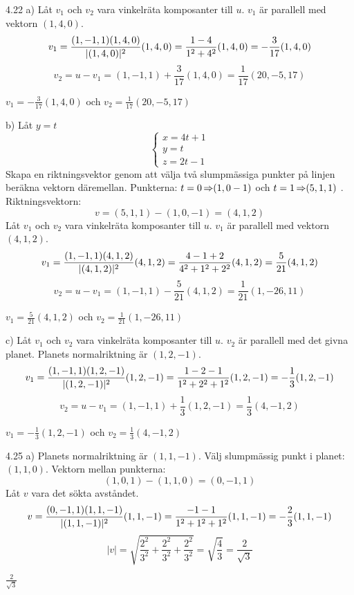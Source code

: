 \begin{task}{4.22 a)}
	Låt $v_1$ och $v_2$ vara vinkelräta komposanter till $u$. $v_1$ är parallell med vektorn $(1,4,0)$.
	\[v_1=\frac{(1,-1,1)\*(1,4,0)}{|(1,4,0)|^2}(1,4,0)=
	\frac{1-4}{1^2+4^2}(1,4,0)=
	-\frac{3}{17}(1,4,0)\]
	\[v_2=u-v_1=(1,-1,1)+\frac{3}{17}(1,4,0)=\frac{1}{17}(20,-5,17)\]

	\ans $v_1=-\frac{3}{17}(1,4,0)$ och $v_2=\frac{1}{17}(20,-5,17)$
\end{task}

\pagebreak
\begin{task}{b)}
	Låt $y=t$
	\[\begin{cases}
		x=4t+1 \\
		y=t \\
		z=2t-1
	\end{cases}\]
	Skapa en riktningsvektor genom att välja två slumpmässiga punkter på linjen beräkna vektorn däremellan.
	Punkterna: $t=0 \operatorname{\Rightarrow} (1,0-1)$ och $t=1 \operatorname{\Rightarrow} (5,1,1)$ . Riktningsvektorn:
	\[v = (5,1,1)-(1,0,-1)=(4,1,2)\]
	Låt $v_1$ och $v_2$ vara vinkelräta komposanter till $u$. $v_1$ är parallell med vektorn $(4,1,2)$.
	\[v_1=\frac{(1,-1,1)\*(4,1,2)}{|(4,1,2)|^2}(4,1,2)=
	\frac{4-1+2}{4^2+1^2+2^2}(4,1,2)=
	\frac{5}{21}(4,1,2)\]
	\[v_2=u-v_1=
	(1,-1,1)-\frac{5}{21}(4,1,2)=
	\frac{1}{21}(1,-26,11)\]

	\ans $v_1=\frac{5}{21}(4,1,2)$ och $v_2=\frac{1}{21}(1,-26,11)$
\end{task}

\begin{task}{c)}
	Låt $v_1$ och $v_2$ vara vinkelräta komposanter till $u$. $v_2$ är parallell med det givna planet.
	Planets normalriktning är $(1,2,-1)$.
	\[v_1=\frac{(1,-1,1)\*(1,2,-1)}{|(1,2,-1)|^2}(1,2,-1)=
	\frac{1-2-1}{1^2+2^2+1^2}(1,2,-1)=
	-\frac{1}{3}(1,2,-1)\]
	\[v_2=u-v_1=(1,-1,1)+\frac{1}{3}(1,2,-1)=\frac{1}{3}(4,-1,2)\]

	\ans $v_1=-\frac{1}{3}(1,2,-1)$ och $v_2=\frac{1}{3}(4,-1,2)$
\end{task}

\begin{task}{4.23}
	\ans
\end{task}

\begin{task}{4.24}
	\ans
\end{task}

\begin{task}{4.25 a)}
	Planets normalriktning är $(1,1,-1)$.
	Välj slumpmässig punkt i planet: $(1,1,0)$.
	Vektorn mellan punkterna: 
	\[(1,0,1)-(1,1,0)=(0,-1,1)\]
	Låt $v$ vara det sökta avståndet.
	\[v=\frac{(0,-1,1)\*(1,1,-1)}{|(1,1,-1)|^2}(1,1,-1)=
	\frac{-1-1}{1^2+1^2+1^2}(1,1,-1)=
	-\frac{2}{3}(1,1,-1)\]
	\[|v|=\sqrt{\frac{2^2}{3^2}+\frac{2^2}{3^2}+\frac{2^2}{3^2}}=
	\sqrt{\frac{4}{3}}=
	\frac{2}{\sqrt{3}}\]

	\ans $\frac{2}{\sqrt{3}}$
\end{task}

